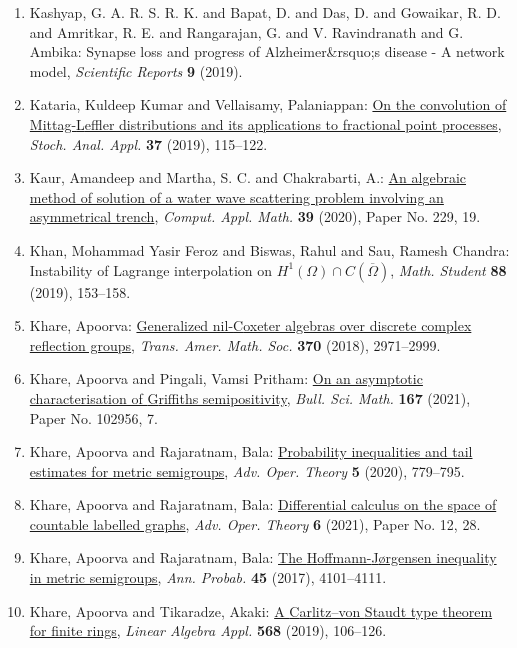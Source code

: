\begin{enumerate}
\item Kashyap, G. A. R. S. R. K. and Bapat, D. and Das, D. and Gowaikar, R. D. and  Amritkar, R. E. and Rangarajan, G. and V. Ravindranath and G. Ambika: Synapse loss and progress of Alzheimer&rsquo;s disease - A network model, \emph{Scientific Reports} {\bf 9} (2019).
\item Kataria, Kuldeep Kumar and Vellaisamy, Palaniappan: \href{https://doi.org/10.1080/07362994.2018.1538803}{On the convolution of {M}ittag-{L}effler distributions and its
applications to fractional point processes}, \emph{Stoch. Anal. Appl.} {\bf 37} (2019), 115--122.
\item Kaur, Amandeep and Martha, S. C. and Chakrabarti, A.: \href{https://doi.org/10.1007/s40314-020-01255-y}{An algebraic method of solution of a water wave scattering
problem involving an asymmetrical trench}, \emph{Comput. Appl. Math.} {\bf 39} (2020), Paper No. 229, 19.
\item Khan, Mohammad Yasir Feroz and Biswas, Rahul and Sau, Ramesh
Chandra: Instability of {L}agrange interpolation on {$H^1(\Omega)\cap
C(\overline\Omega)$}, \emph{Math. Student} {\bf 88} (2019), 153--158.
\item Khare, Apoorva: \href{https://doi.org/10.1090/tran/7304}{Generalized nil-{C}oxeter algebras over discrete complex
reflection groups}, \emph{Trans. Amer. Math. Soc.} {\bf 370} (2018), 2971--2999.
\item Khare, Apoorva and Pingali, Vamsi Pritham: \href{https://doi.org/10.1016/j.bulsci.2021.102956}{On an asymptotic characterisation of {G}riffiths
semipositivity}, \emph{Bull. Sci. Math.} {\bf 167} (2021), Paper No. 102956, 7.
\item Khare, Apoorva and Rajaratnam, Bala: \href{https://doi.org/10.1007/s43036-020-00048-8}{Probability inequalities and tail estimates for metric
semigroups}, \emph{Adv. Oper. Theory} {\bf 5} (2020), 779--795.
\item Khare, Apoorva and Rajaratnam, Bala: \href{https://doi.org/10.1007/s43036-020-00111-4}{Differential calculus on the space of countable labelled
graphs}, \emph{Adv. Oper. Theory} {\bf 6} (2021), Paper No. 12, 28.
\item Khare, Apoorva and Rajaratnam, Bala: \href{https://doi.org/10.1214/16-AOP1160}{The {H}offmann-{J}\o rgensen inequality in metric semigroups}, \emph{Ann. Probab.} {\bf 45} (2017), 4101--4111.
\item Khare, Apoorva and Tikaradze, Akaki: \href{https://doi.org/10.1016/j.laa.2018.05.035}{A {C}arlitz--von {S}taudt type theorem for finite rings}, \emph{Linear Algebra Appl.} {\bf 568} (2019), 106--126.

\end{enumerate}
